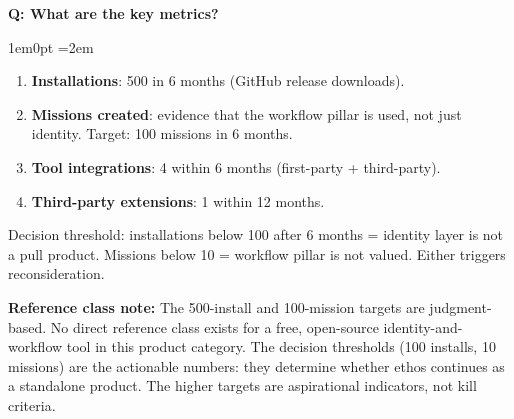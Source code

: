 \documentclass[11pt,letterpaper]{article}
\newcounter{faqnum}
\newenvironment{faqpair}[1]{%
  \needspace{4\baselineskip}%
  \vspace{0.5em}%
  \refstepcounter{faqnum}%
  \noindent\textbf{\color{SectionBlue}Q\thefaqnum: #1}\par\nopagebreak[4]%
  \vspace{0.2em}%
  \begin{adjustwidth}{1em}{0pt}%
  \setlength{\parindent}{0pt}%
  \emergencystretch=2em%
}{%
  \end{adjustwidth}%
  \vspace{0.5em}%
}
\begin{document}
\begin{faqpair}{What are the key metrics?}
\begin{enumerate}[nosep]
  \item \textbf{Installations}: 500 in 6 months (GitHub release downloads).
  \item \textbf{Missions created}: evidence that the workflow pillar is used, not just identity. Target: 100 missions in 6 months.
  \item \textbf{Tool integrations}: 4 within 6 months (first-party + third-party).
  \item \textbf{Third-party extensions}: 1 within 12 months.
\end{enumerate}

Decision threshold: installations below 100 after 6 months = identity layer is not a pull product. Missions below 10 = workflow pillar is not valued. Either triggers reconsideration.

\textbf{Reference class note:} The 500-install and 100-mission targets are judgment-based. No direct reference class exists for a free, open-source identity-and-workflow tool in this product category. The decision thresholds (100 installs, 10 missions) are the actionable numbers: they determine whether ethos continues as a standalone product. The higher targets are aspirational indicators, not kill criteria.
\end{faqpair}
\end{document}
